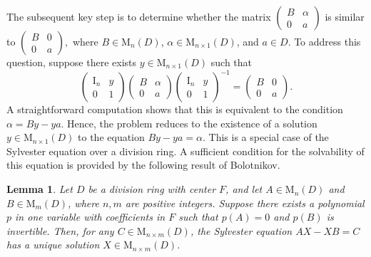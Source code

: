 \documentclass[11pt]{article}
\newtheorem{lemma}[theorem]{Lemma}
\theoremstyle{definition}
\begin{document}
{{{{				
				
				
				The subsequent key step is to determine whether the matrix $\begin{pmatrix}
					B & \alpha \\
					0 & a
				\end{pmatrix}$
				is similar to
				$\begin{pmatrix}
					B & 0 \\
					0 & a
				\end{pmatrix},$	where \( B \in \mathrm{M}_n(D) \), \( \alpha \in \mathrm{M}_{n \times 1}(D) \), and \( a \in D \). To address this question, suppose there exists \( y \in \mathrm{M}_{n \times 1}(D) \) such that
				\[
				\begin{pmatrix}
					\mathrm{I}_n & y \\
					0 & 1
				\end{pmatrix}
				\begin{pmatrix}
					B & \alpha \\
					0 & a
				\end{pmatrix}
				\begin{pmatrix}
					\mathrm{I}_n & y \\
					0 & 1
				\end{pmatrix}^{-1}
				=
				\begin{pmatrix}
					B & 0 \\
					0 & a
				\end{pmatrix}.
				\]
				A straightforward computation shows that this is equivalent to the condition $ \alpha = By - ya.$ Hence, the problem reduces to the existence of a solution \( y \in \mathrm{M}_{n \times 1}(D) \) to the equation $By - ya = \alpha.$
				This is a special case of the Sylvester equation over a division ring. A sufficient condition for the solvability of this equation is provided by the following result of Bolotnikov.
				
				\begin{lemma} {\rm \cite[Lemma 3.1]{Bo_Bo_22}} \label{lem Bo}
					Let $D$ be a division ring with center $F$, and let \( A \in \mathrm{M}_n(D) \) and \( B \in \mathrm{M}_m(D) \), where \( n, m \) are positive integers. Suppose there exists a polynomial \( p \) in one variable with coefficients in $F$ such that \( p(A) = 0 \) and \( p(B) \) is invertible. Then, for any \( C \in \mathrm{M}_{n \times m}(D) \), the Sylvester equation
					$AX - XB = C$
					has a unique solution \( X \in \mathrm{M}_{n \times m}(D) \).
				\end{lemma}
				
}}}}
\end{document}
